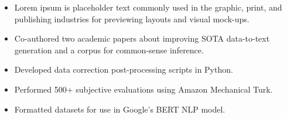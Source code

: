 \documentclass[10pt,a4paper,ragged2e]{altacv}
\begin{document}


\begin{fullwidth}
\makecvheader
\end{fullwidth}



\begin{itemize}
\item Lorem ipsum is placeholder text commonly used in the graphic, print, and publishing industries for previewing layouts and visual mock-ups.
\end{itemize}

\divider

\begin{itemize}
\item Co-authored two academic papers about improving SOTA data-to-text generation and a corpus for common-sense inference.
\item Developed data correction post-processing scripts in Python.
\item Performed 500+ subjective evaluations using Amazon Mechanical Turk.
\item Formatted datasets for use in Google's BERT NLP model.
\end{itemize}

\divider
\end{document}
